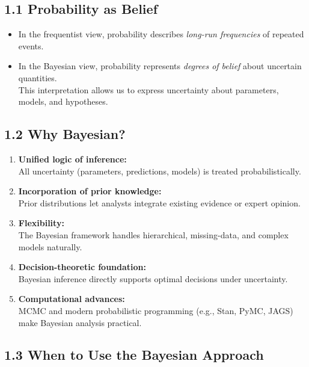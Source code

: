\documentclass[
  letterpaper,
  DIV=11,
  numbers=noendperiod]{scrreprt}
\providecommand{\tightlist}{%
  \setlength{\itemsep}{0pt}\setlength{\parskip}{0pt}}
\begin{document}
\subsection{1.1 Probability as Belief}\label{probability-as-belief}

\begin{itemize}
\tightlist
\item
  In the frequentist view, probability describes \emph{long-run
  frequencies} of repeated events.\\
\item
  In the Bayesian view, probability represents \emph{degrees of belief}
  about uncertain quantities.\\
  This interpretation allows us to express uncertainty about parameters,
  models, and hypotheses.
\end{itemize}

\subsection{1.2 Why Bayesian?}\label{why-bayesian-1}

\begin{enumerate}
\def\labelenumi{\arabic{enumi}.}
\tightlist
\item
  \textbf{Unified logic of inference:}\\
  All uncertainty (parameters, predictions, models) is treated
  probabilistically.\\
\item
  \textbf{Incorporation of prior knowledge:}\\
  Prior distributions let analysts integrate existing evidence or expert
  opinion.\\
\item
  \textbf{Flexibility:}\\
  The Bayesian framework handles hierarchical, missing-data, and complex
  models naturally.\\
\item
  \textbf{Decision-theoretic foundation:}\\
  Bayesian inference directly supports optimal decisions under
  uncertainty.\\
\item
  \textbf{Computational advances:}\\
  MCMC and modern probabilistic programming (e.g., Stan, PyMC, JAGS)
  make Bayesian analysis practical.
\end{enumerate}

\subsection{1.3 When to Use the Bayesian
Approach}\label{when-to-use-the-bayesian-approach}
\end{document}
